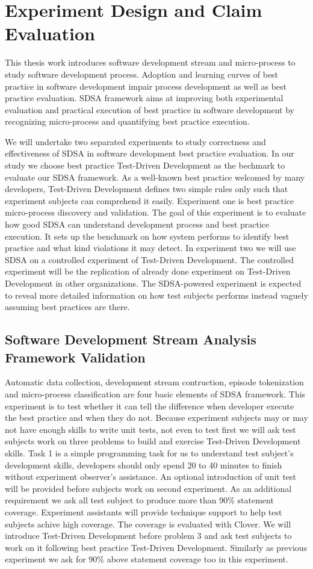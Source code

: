 \chapter{Experiment Design and Claim Evaluation}
\label{chap:Evaluation}
This thesis work introduces software development stream and micro-process
to study software development process. Adoption and learning curves of best
practice in software development impair process development as well as best
practice evaluation. SDSA framework aims at improving both experimental
evaluation and practical execution of best practice in software development
by recognizing micro-process and quantifying best practice execution. 

We will undertake two separated experiments to study correctness and
effectiveness of SDSA in software development best practice evaluation.  In
our study we choose best practice Test-Driven Development as the bechmark
to evaluate our SDSA framework. As a well-known best practice welcomed by
many developers, Test-Driven Development defines two simple rules only such
that experiment subjects can comprehend it easily. Experiment one is best
practice micro-process discovery and validation. The goal of this
experiment is to evaluate how good SDSA can understand development process
and best practice execution. It sets up the benchmark on how system performs
to identify best practice and what kind violations it may detect. In experiment 
two we will use SDSA on a controlled experiment of Test-Driven Development. The
controlled experiment will be the replication of already done experiment on
Test-Driven Development in other organizations. The SDSA-powered experiment
is expected to reveal more detailed information on how test subjects performs
instead vaguely assuming best practices are there. 

\section{Software Development Stream Analysis Framework Validation}
Automatic data collection, development stream contruction, episode
tokenization and micro-process classification are four basic elements of
SDSA framework. This experiment is to test whether it can tell the
difference when developer execute the best practice and when they do not.
Because experiment subjects may or may not have enough skills to write unit
tests, not even to test first we will ask test subjects work on three
problems to build and exercise Test-Driven Development skills. Task 1 is a
simple programming task for us to understand test subject's development
skills, developers should only spend 20 to 40 minutes to finish without
experiment observer's assistance. An optional introduction of unit test
will be provided before subjects work on second experiment. As an
additional requirement we ask all test subject to produce more than 90\%
statement coverage. Experiment assistants will provide technique support to
help test subjects achive high coverage. The coverage is evaluated with
Clover. We will introduce Test-Driven Development before problem 3 and ask
test subjects to work on it following best practice Test-Driven
Development. Similarly as previous experiment we ask for 90\% above
statement coverage too in this experiment.

